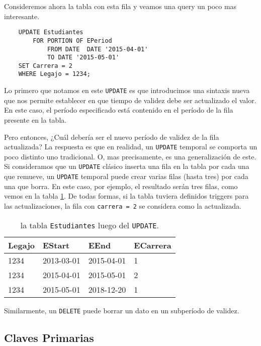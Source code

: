 Consideremos ahora la tabla con esta fila y veamos una query un poco mas interesante.

\begin{verbatim}
    UPDATE Estudiantes
        FOR PORTION OF EPeriod
            FROM DATE  DATE '2015-04-01'
            TO DATE '2015-05-01'
    SET Carrera = 2
    WHERE Legajo = 1234;
\end{verbatim}

Lo primero que notamos en este \texttt{UPDATE} es que introducimos una sintaxis nueva que nos permite establecer
en que tiempo de validez debe ser actualizado el valor.
En este caso, el período especificado está contenido en el período de la fila presente en la tabla.

Pero entonces, ¿Cuál debería ser el nuevo período de validez de la fila actualizada?
La respuesta es que en realidad, un \texttt{UPDATE} temporal se comporta un poco distinto uno tradicional.
O, mas precisamente, es una generalización de este.
Si consideramos que un \texttt{UPDATE} clásico inserta una fila en la tabla por cada una que remueve,
un \texttt{UPDATE} temporal puede crear varias filas (hasta tres) por cada una que borra.
En este caso, por ejemplo, el resultado serán tres filas, como vemos en la tabla \ref{tab:update}.
De todas formas, si la tabla tuviera definidos triggers para las actualizaciones,
la fila con \texttt{carrera = 2} se considera como la actualizada.

\begin{table}[]
    \center \begin{tabular}{l|l|l|l}
    Legajo & EStart     & EEnd       & ECarrera \\ \hline
    1234   & 2013-03-01 & 2015-04-01 & 1        \\
    1234   & 2015-04-01 & 2015-05-01 & 2        \\
    1234   & 2015-05-01 & 2018-12-20 & 1
    \end{tabular}
    \caption{la tabla \texttt{Estudiantes} luego del \texttt{UPDATE}.}
    \label{tab:update}
\end{table}

Similarmente, un \texttt{DELETE} puede borrar un dato en un subperíodo de validez.

\subsection{Claves Primarias}


